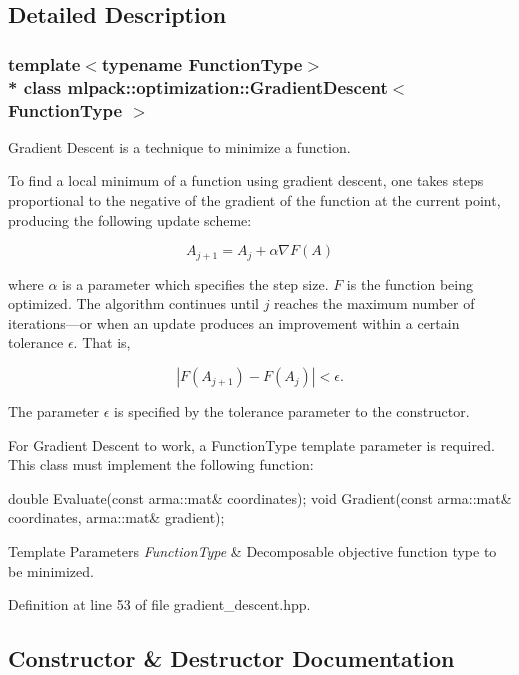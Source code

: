\subsection{Detailed Description}
\subsubsection*{template$<$typename Function\+Type$>$\\*
class mlpack\+::optimization\+::\+Gradient\+Descent$<$ Function\+Type $>$}

Gradient Descent is a technique to minimize a function. 

To find a local minimum of a function using gradient descent, one takes steps proportional to the negative of the gradient of the function at the current point, producing the following update scheme\+:

\[ A_{j + 1} = A_j + \alpha \nabla F(A) \]

where $ \alpha $ is a parameter which specifies the step size. $ F $ is the function being optimized. The algorithm continues until $ j $ reaches the maximum number of iterations---or when an update produces an improvement within a certain tolerance $ \epsilon $. That is,

\[ | F(A_{j + 1}) - F(A_j) | < \epsilon. \]

The parameter $\epsilon$ is specified by the tolerance parameter to the constructor.

For Gradient Descent to work, a Function\+Type template parameter is required. This class must implement the following function\+:

double Evaluate(const arma\+::mat\& coordinates); void Gradient(const arma\+::mat\& coordinates, arma\+::mat\& gradient);


\begin{DoxyTemplParams}{Template Parameters}
{\em Function\+Type} & Decomposable objective function type to be minimized. \\
\hline
\end{DoxyTemplParams}


Definition at line 53 of file gradient\+\_\+descent.\+hpp.



\subsection{Constructor \& Destructor Documentation}
